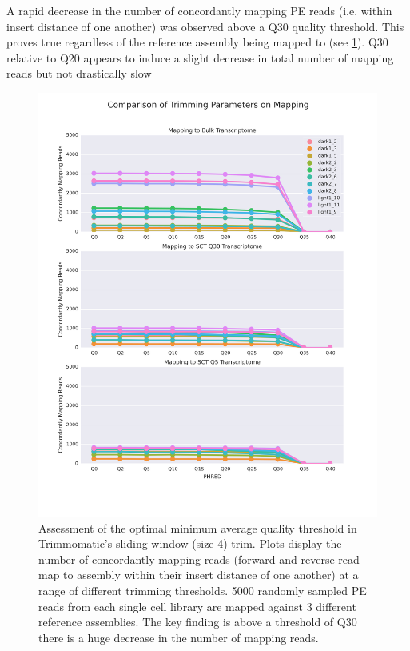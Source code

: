 A rapid decrease in the number of concordantly mapping PE reads (i.e.
within insert distance of one another) was observed above a Q30 quality threshold.
This proves true regardless of the reference assembly being mapped to
(see \ref{fig:trimmingopt}).  Q30 relative to Q20 appears to induce a 
slight decrease in total number of mapping reads but not drastically slow 

\begin{figure}
    \includegraphics[width=\textwidth]{trimmingopt.svg}
    \caption{Assessment of the optimal minimum average quality threshold
             in Trimmomatic's sliding window (size 4) trim.  Plots
             display the number of concordantly mapping reads (forward
                 and reverse read map to assembly within their insert
             distance of one another) at a range of different trimming
             thresholds.  5000 randomly sampled PE reads 
             from each single cell library are mapped against 3 different 
             reference assemblies. 
             The key finding is above a threshold of Q30 there is a huge
         decrease in the number of mapping reads.}
         \label{fig:trimmingopt}
\end{figure}

